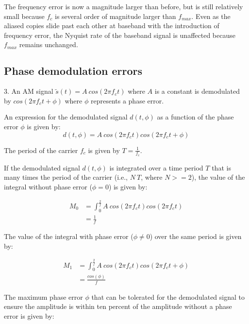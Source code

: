 \documentclass[letterpaper,12pt]{article}
\begin{document}
The frequency error is now a magnitude larger than before, but is still
relatively small because $f_{c}$ is several order of magnitude larger than
$f_{max}$. Even as the aliased copies slide past each other at baseband with
the introduction of frequency error, the Nyquist rate of the baseband signal is
unaffected because $f_{max}$ remains unchanged.
\pagebreak

\subsection*{Phase demodulation errors}

3. An AM signal $\tilde{s}(t)=A\ cos(2 \pi f_{c}t)$ where $A$ is a constant is
demodulated by $cos(2 \pi f_{c}t+\phi)$ where $\phi$ represents a phase error.

An expression for the demodulated signal $d(t,\phi)$ as a function of the phase
error $\phi$ is given by:
\begin{equation}
d(t,\phi)=A\ cos(2 \pi f_{c}t)cos(2 \pi f_{c}t+\phi)
\end{equation}

The period of the carrier $f_{c}$ is given by $T=\frac{1}{f_{c}}$.

If the demodulated signal $d(t,\phi)$ is integrated over a time period $T$ that
is many times the period of the carrier (i.e., $N\ T$, where $N >= 2$), the value
of the integral without phase error ($\phi=0$) is given by:

\begin{equation}
\begin{split}
M_{0} & = \int_{0}^{\frac{2}{f}}A\ cos(2\pi f_{c}t)cos(2\pi f_{c}t) \\
 & = \frac{1}{f}
\end{split}
\end{equation}

The value of the integral with phase error ($\phi\neq0$) over the same period is
given by:

\begin{equation}
\begin{split}
M_{1} & = \int_{0}^{\frac{2}{f}}A\ cos(2\pi f_{c}t)cos(2\pi f_{c}t+\phi) \\
 & = \frac{cos(\phi)}{f}
\end{split}
\end{equation}

The maximum phase error $\phi$ that can be tolerated for the demodulated signal
to ensure the amplitude is within ten percent of the amplitude without a phase
error is given by:
\end{document}
